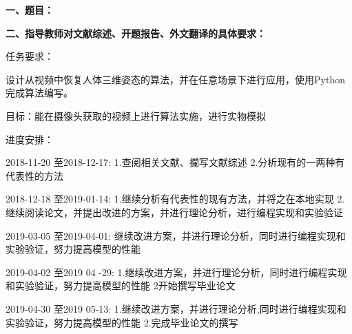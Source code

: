 {
    \setlength{\parindent}{0em}
    \par {\bfseries 一、题目：\Title}
    \\
    \par {\bfseries 二、指导教师对文献综述、开题报告、外文翻译的具体要求：}

    任务要求：

设计从视频中恢复人体三维姿态的算法，并在任意场景下进行应用，使用Python完成算法编写。

目标：能在摄像头获取的视频上进行算法实施，进行实物模拟
 
进度安排：

2018-11-20 至2018-12-17: 1.查阅相关文献、攔写文献综述  2.分析现有的一两种有代表性的方法
      
2018-12-18 至2019-01-14: 1.继续分析有代表性的现有方法，并将之在本地实现  2.继续阅读论文，并提出改进的方案，并进行理论分析，进行编程实现和实验验证

2019-03-05 至2019-04-01: 继续改进方案，并进行理论分析，同时进行编程实现和实验验证，努力提高模型的性能

2019-04-02 至2019 04 -29: 1.继续改进方案，并进行理论分析，同时进行编程实现和实验验证，努力提高模型的性能  2开始撰写毕业论文

2019-04-30 至2019 05-13: 1.继续改进方案，并进行理论分析,同时进行编程实现和实验验证，努力提高模型的性能  2.完成毕业论文的撰写

}

\mbox{} \vfill

\signature{指导教师（签名）}
